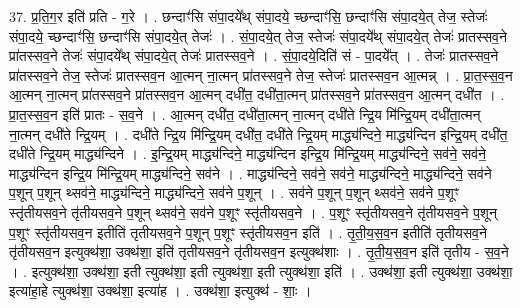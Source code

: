 \documentclass[17pt]{extarticle}
\begin{document}
37. प्र॒ति॒ग॒र इति॑ प्रति - ग॒रे । . छन्दाꣳ॑सि संपा॒दये᳚थ् संपा॒दये॒ च्छन्दाꣳ॑सि॒ छन्दाꣳ॑सि संपा॒दये॒त् तेज॒ स्तेजः॑ संपा॒दये॒ च्छन्दाꣳ॑सि॒ छन्दाꣳ॑सि संपा॒दये॒त् तेजः॑ । . सं॒पा॒दये॒त् तेज॒ स्तेजः॑ संपा॒दये᳚थ् संपा॒दये॒त् तेजः॑ प्रातस्सव॒ने प्रा॑तस्सव॒ने तेजः॑ संपा॒दये᳚थ् संपा॒दये॒त् तेजः॑ प्रातस्सव॒ने । . सं॒पा॒दये॒दिति॑ सं - पा॒दये᳚त् । . तेजः॑ प्रातस्सव॒ने प्रा॑तस्सव॒ने तेज॒ स्तेजः॑ प्रातस्सव॒न आ॒त्मन् ना॒त्मन् प्रा॑तस्सव॒ने तेज॒ स्तेजः॑ प्रातस्सव॒न आ॒त्मन्न् । . प्रा॒त॒स्स॒व॒न आ॒त्मन् ना॒त्मन् प्रा॑तस्सव॒ने प्रा॑तस्सव॒न आ॒त्मन् दधी॑त॒ दधी॑ता॒त्मन् प्रा॑तस्सव॒ने प्रा॑तस्सव॒न आ॒त्मन् दधी॑त । . प्रा॒त॒स्स॒व॒न इति॑ प्रातः - स॒व॒ने । . आ॒त्मन् दधी॑त॒ दधी॑ता॒त्मन् ना॒त्मन् दधी॑ते न्द्रि॒य मि॑न्द्रि॒यम् दधी॑ता॒त्मन् ना॒त्मन् दधी॑ते न्द्रि॒यम् । . दधी॑ते न्द्रि॒य मि॑न्द्रि॒यम् दधी॑त॒ दधी॑ते न्द्रि॒यम् माद्ध्य॑न्दिने॒ माद्ध्य॑न्दिन इन्द्रि॒यम् दधी॑त॒ दधी॑ते न्द्रि॒यम् माद्ध्य॑न्दिने । . इ॒न्द्रि॒यम् माद्ध्य॑न्दिने॒ माद्ध्य॑न्दिन इन्द्रि॒य मि॑न्द्रि॒यम् माद्ध्य॑न्दिने॒ सव॑ने॒ सव॑ने॒ माद्ध्य॑न्दिन इन्द्रि॒य मि॑न्द्रि॒यम् माद्ध्य॑न्दिने॒ सव॑ने । . माद्ध्य॑न्दिने॒ सव॑ने॒ सव॑ने॒ माद्ध्य॑न्दिने॒ माद्ध्य॑न्दिने॒ सव॑ने प॒शून् प॒शून् थ्सव॑ने॒ माद्ध्य॑न्दिने॒ माद्ध्य॑न्दिने॒ सव॑ने प॒शून् । . सव॑ने प॒शून् प॒शून् थ्सव॑ने॒ सव॑ने प॒शूꣳ स्तृ॑तीयसव॒ने तृ॑तीयसव॒ने प॒शून् थ्सव॑ने॒ सव॑ने प॒शूꣳ स्तृ॑तीयसव॒ने । . प॒शूꣳ स्तृ॑तीयसव॒ने तृ॑तीयसव॒ने प॒शून् प॒शूꣳ स्तृ॑तीयसव॒न इतीति॑ तृतीयसव॒ने प॒शून् प॒शूꣳ स्तृ॑तीयसव॒न इति॑ । . तृ॒ती॒य॒स॒व॒न इतीति॑ तृतीयसव॒ने तृ॑तीयसव॒न इत्युक्थ॑शा॒ उक्थ॑शा॒ इति॑ तृतीयसव॒ने तृ॑तीयसव॒न इत्युक्थ॑शाः । . तृ॒ती॒य॒स॒व॒न इति॑ तृतीय - स॒व॒ने । . इत्युक्थ॑शा॒ उक्थ॑शा॒ इती त्युक्थ॑शा॒ इती त्युक्थ॑शा॒ इती त्युक्थ॑शा॒ इति॑ । . उक्थ॑शा॒ इती त्युक्थ॑शा॒ उक्थ॑शा॒ इत्या॑हा॒हे त्युक्थ॑शा॒ उक्थ॑शा॒ इत्या॑ह । . उक्थ॑शा॒ इत्युक्थ॑ - शाः॒ । \newline
\end{document}
